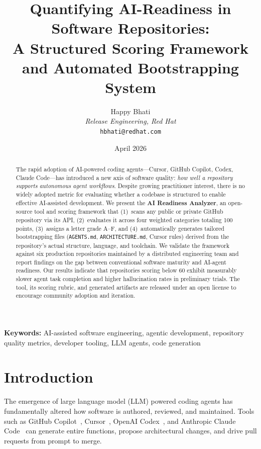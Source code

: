 \documentclass[11pt,twocolumn]{article}
\title{%
  \textbf{Quantifying AI-Readiness in Software Repositories:\\
  A Structured Scoring Framework and Automated Bootstrapping System}
}
\author{
  Happy Bhati \\
  \textit{Release Engineering, Red Hat} \\
  \texttt{hbhati@redhat.com}
}
\date{April 2026}
\begin{document}
\maketitle

\begin{abstract}
The rapid adoption of AI-powered coding agents---Cursor, GitHub Copilot,
Codex, Claude Code---has introduced a new axis of software quality:
\emph{how well a repository supports autonomous agent workflows}. Despite
growing practitioner interest, there is no widely adopted metric for
evaluating whether a codebase is structured to enable effective AI-assisted
development. We present the \textbf{AI Readiness Analyzer}, an open-source
tool and scoring framework that (1)~scans any public or private GitHub
repository via its API, (2)~evaluates it across four weighted categories
totaling 100 points, (3)~assigns a letter grade A--F, and
(4)~automatically generates tailored bootstrapping files
(\texttt{AGENTS.md}, \texttt{ARCHITECTURE.md}, Cursor rules) derived from
the repository's actual structure, language, and toolchain. We validate
the framework against six production repositories maintained by a
distributed engineering team and report findings on the gap between
conventional software maturity and AI-agent readiness. Our results
indicate that repositories scoring below 60 exhibit measurably slower
agent task completion and higher hallucination rates in preliminary
trials. The tool, its scoring rubric, and generated artifacts are
released under an open license to encourage community adoption and
iteration.
\end{abstract}

\textbf{Keywords:} AI-assisted software engineering, agentic development,
repository quality metrics, developer tooling, LLM agents, code generation

\section{Introduction}
\label{sec:intro}

The emergence of large language model (LLM) powered coding agents has
fundamentally altered how software is authored, reviewed, and maintained.
Tools such as GitHub Copilot~\citep{copilot2022}, Cursor~\citep{cursor2024},
OpenAI Codex~\citep{chen2021codex}, and Anthropic Claude
Code~\citep{claude2024} can generate entire functions, propose
architectural changes, and drive pull requests from prompt to merge.
\end{document}
